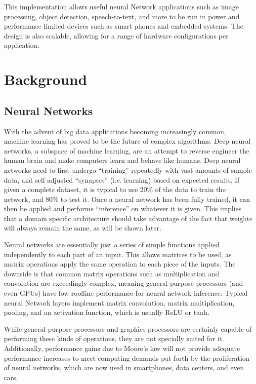 \documentclass[11pt, conference, onecolumn]{IEEEtran}
\begin{document}
    This implementation allows useful neural Network applications such as image processing,
    object detection, speech-to-text, and more to be run in power and performance limited
    devices such as smart phones and embedded systems. The design is also scalable,
    allowing for a range of hardware configurations per application.
\section{Background}

\subsection{Neural Networks}
    With the advent of big data applications becoming increasingly common, machine learning
    has proved to be the future of complex algorithms. Deep neural networks, a subspace of
    machine learning, are an attempt to reverse engineer the human brain and make computers
    learn and behave like humans. Deep neural networks need to first undergo “training”
    repeatedly with vast amounts of sample data, and self adjusted “synapses”
    (i.e. learning) based on expected results. If given a complete dataset, it is typical
    to use 20\% of the data to train the network, and 80\% to test it. Once a neural
    network has been fully trained, it can then be applied and performs  “inference” on
    whatever it is given. This implies that a domain specific architecture should take
    advantage of the fact that weights will always remain the same, as will be shown later.

    Neural networks are essentially just a series of simple functions applied independently
    to each part of an input. This allows matrices to be used, as matrix operations apply
    the same operation to each piece of the inputs. The downside is that common matrix
    operations such as multiplication and convolution are exceedingly complex, meaning
    general purpose processors (and even GPUs) have low roofline performance for
    neural network inference. Typical neural Network layers implement matrix convolution,
    matrix multiplication, pooling, and an activation function, which is usually ReLU or
    tanh.

    While general purpose processors and graphics processors are certainly capable of
    performing these kinds of operations, they are not specially suited for it.
    Additionally, performance gains due to Moore's law will not provide adequate
    performance increases to meet computing demands put forth by the proliferation of
    neural networks, which are now used in smartphones, data centers, and even cars.
\end{document}
